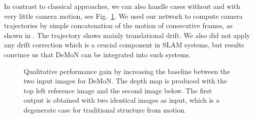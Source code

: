 \documentclass[10pt,twocolumn,letterpaper]{article}
\begin{document}
In contrast to classical approaches, we can also handle cases without and with very little camera motion, see Fig.~\ref{fig:small_baseline}.
  We used our network to compute camera trajectories by simple concatenation of the motion of consecutive frames, as shown in .
The trajectory shows mainly translational drift. 
We also did not apply any drift correction which is a crucial component in SLAM systems, but results convince us that DeMoN can be integrated into such systems.



\begin{figure}
\begin{center}
\end{center}
\vspace{\capvspace}%
\caption{%
Qualitative performance gain by increasing the baseline between the two input images for DeMoN. The depth map is produced with the top left reference image and the second image below. The first output is obtained with two identical images as input, which is a degenerate case for traditional structure from motion. 
}
\label{fig:small_baseline}
\vspace{\figvspace}%
\end{figure}
\end{document}
